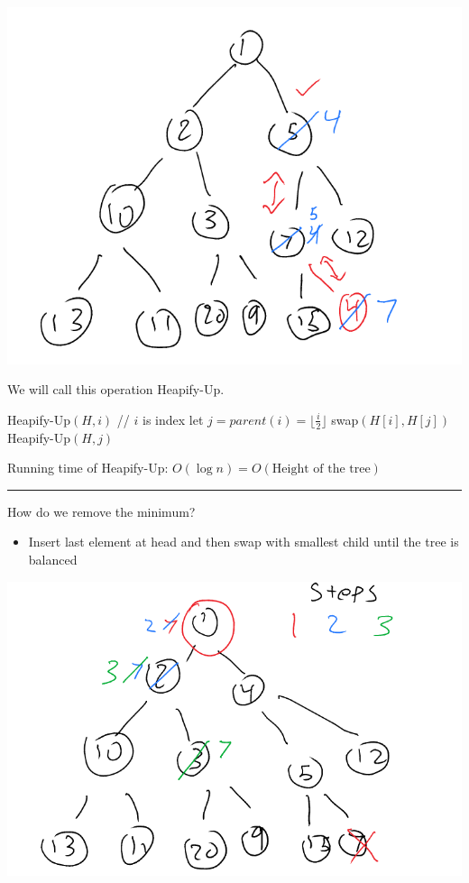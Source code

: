 \documentclass[11pt]{article}
\begin{document}
\begin{center}
\includegraphics[width=.9\linewidth]{./Images/i14.png}
\end{center}

We will call this operation Heapify-Up.
\begin{algorithmic}
\State Heapify-Up$(H,i)$ // $i$ is index
    \State let $j=parent(i)=\lfloor \frac{i}{2} \rfloor $
    \State swap$(H[i],H[j])$
    \State Heapify-Up$(H,j)$
\EndIf
\EndIf
\end{algorithmic}
Running time of Heapify-Up: \(O(\log n)=O(\text{Height of the tree})\)

\noindent\rule{\textwidth}{0.5pt}
How do we remove the minimum?
\begin{itemize}
\item Insert last element at head and then swap with smallest child until the tree is balanced
\end{itemize}
\begin{center}
\includegraphics[width=.9\linewidth]{./Images/i15.png}
\end{center}
\end{document}
